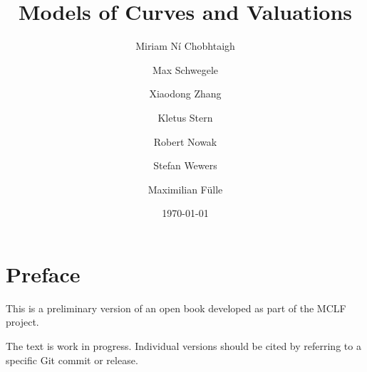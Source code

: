 \documentclass[11pt,a4paper,oneside]{book}
\title{Models of Curves and Valuations}
\author{
Miriam Ní Chobhtaigh \and
Max Schwegele \and
Xiaodong Zhang \and
Kletus Stern \and
Robert Nowak \and
Stefan Wewers \and
Maximilian Fülle
}
\date{\today}
\begin{document}
\frontmatter

\maketitle

\tableofcontents

\chapter*{Preface}

This is a preliminary version of an open book developed as part of the MCLF project.

The text is work in progress.
Individual versions should be cited by referring to a specific Git commit or release.

\mainmatter




\backmatter



\end{document}
